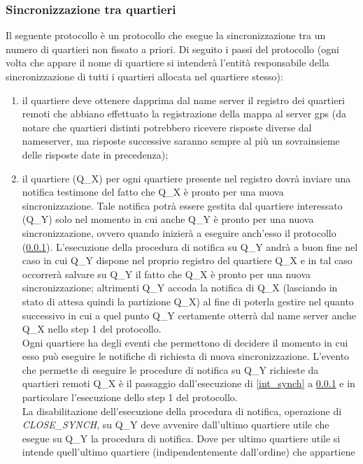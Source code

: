 \subsubsection{Sincronizzazione tra quartieri}
\label{quart_synch}
Il seguente protocollo è un protocollo che esegue la sincronizzazione tra un
numero di quartieri non fissato a priori. Di seguito i passi del protocollo
(ogni volta che appare il nome di quartiere si intenderà l'entità responsabile
della sincronizzazione di tutti i quartieri allocata nel quartiere stesso):
\begin{enumerate}
\item il quartiere deve ottenere dapprima dal name server il registro dei
quartieri remoti che abbiano effettuato la registrazione della mappa al server
gps (da notare che quartieri distinti potrebbero ricevere risposte diverse dal
nameserver, ma risposte successive saranno sempre al più un sovrainsieme delle
risposte date in precedenza);
\item il quartiere (Q\_X) per ogni quartiere presente nel registro dovrà
 inviare una notifica testimone del fatto che Q\_X è pronto per una nuova
sincronizzazione. Tale notifica potrà essere gestita dal quartiere interessato
(Q\_Y) solo nel momento in cui anche Q\_Y è pronto per una nuova
sincronizzazione, ovvero quando inizierà a eseguire anch'esso il protocollo
(\ref{quart_synch}). L'esecuzione della procedura di notifica su Q\_Y andrà a
buon fine nel caso in cui Q\_Y dispone nel proprio registro del quartiere Q\_X
e in tal caso occorrerà salvare su Q\_Y il fatto che Q\_X è pronto per una
nuova sincronizzazione; altrimenti Q\_Y accoda la notifica di Q\_X (lasciando
in stato di attesa quindi la partizione Q\_X) al fine di poterla gestire nel
quanto successivo in cui a quel punto Q\_Y certamente otterrà dal name server
anche Q\_X nello step 1 del protocollo. \\
Ogni quartiere ha degli eventi che permettono di decidere il momento in cui
esso può eseguire le notifiche di richiesta di nuova sincronizzazione. L'evento
che permette di eseguire le procedure di notifica su Q\_Y richieste da
quartieri remoti Q\_X è il passaggio dall'esecuzione di \ref{int_synch} a
\ref{quart_synch} e in particolare l'esecuzione dello step 1 del protocollo. \\
La disabilitazione dell'esecuzione della procedura di notifica, operazione di
\textit{CLOSE\_SYNCH}, su Q\_Y deve avvenire dall'ultimo quartiere utile che
esegue su Q\_Y la procedura di notifica. Dove per ultimo quartiere utile si
intende quell'ultimo quartiere (indipendentemente dall'ordine) che appartiene

\end{enumerate}
